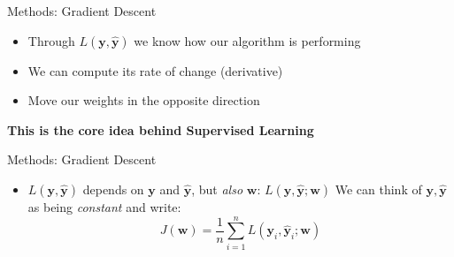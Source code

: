\begin{slide}{Methods: Gradient Descent}
  \centering
\begin{itemize}
  \item Through $L(\mathbf{y}, \mathbf{\hat{y}})$ we know how our algorithm is performing
  \item We can compute its rate of change (derivative)
  \item Move our weights in the opposite direction
\end{itemize}

\pause
\vspace{1cm}
\textbf{This is the core idea behind Supervised Learning}
\end{slide}

\begin{slide}{Methods: Gradient Descent}
  \centering
  \begin{itemize}
    \item $L(\mathbf{y}, \mathbf{\hat{y}})$ depends on $\mathbf{y}$ and $\mathbf{\hat{y}}$, but \emph{also} $\mathbf{w}$: $L(\mathbf{y}, \mathbf{\hat{y}}; \mathbf{w})$
    \pitem We can think of $\mathbf{y}, \mathbf{\hat{y}}$ as being \emph{constant} and write: $$J(\mathbf{w}) = \frac{1}{n}\sum_{i=1}^n L(\mathbf{y}_i, \mathbf{\hat{y}}_i; \mathbf{w})$$
  \end{itemize}
  \vspace{0.5cm}
\end{slide}

